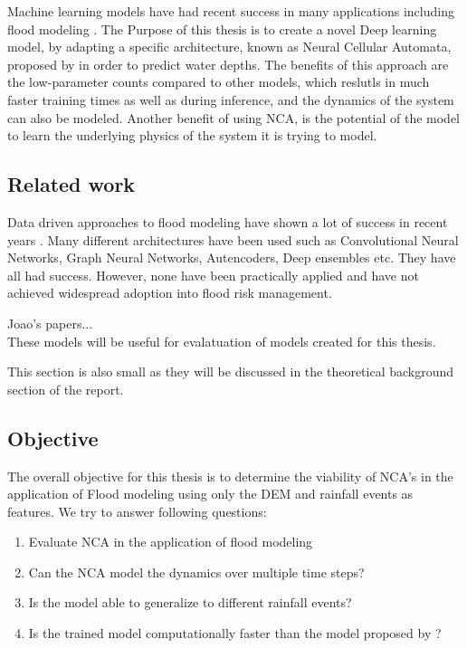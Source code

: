 Machine learning models have had recent success in many applications including flood modeling \cite{russo2023evaluation, karim2023review, chaudhary2022flood}. The Purpose of this thesis is to create a novel Deep learning model, by adapting a specific architecture, known as Neural Cellular Automata, proposed by \citeauthor{growing_nca} \cite{growing_nca} in order to predict water depths. The benefits of this approach are the low-parameter counts compared to other models, which reslutls in much faster training times as well as during inference, and the dynamics of the system can also be modeled. Another benefit of using NCA, is the potential of the model to learn the underlying physics of the system it is trying to model.

\subsection{Related work}
Data driven approaches to flood modeling have shown a lot of success in recent years \cite{russo2023evaluation, karim2023review, chaudhary2022flood}. Many different architectures have been used such as Convolutional Neural Networks, Graph Neural Networks, Autencoders, Deep ensembles etc. They have all had success. However, none have been practically applied and have not achieved widespread adoption into flood risk management. 

Joao's papers... \\

These models will be useful for evalatuation of models created for this thesis.

This section is also small as they will be discussed in the theoretical background section of the report.

\subsection{Objective}
The overall objective for this thesis is to determine the viability of NCA's in the application of Flood modeling using only the DEM and rainfall events as features. We try to answer following questions:

\begin{enumerate}
	\item Evaluate NCA in the application of flood modeling 
	\item Can the NCA model the dynamics over multiple time steps?
	\item Is the model able to generalize to different rainfall events?
	\item Is the trained model computationally faster than the model proposed by \cite{guidolin2016weighted}?
\end{enumerate}